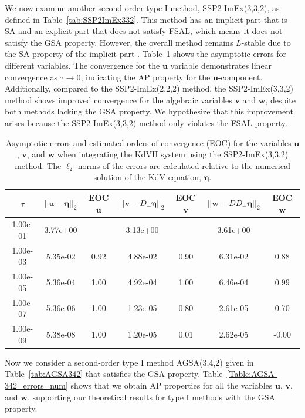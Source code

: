 \documentclass{article}
\newcommand{\ukdv}{\eta}
\begin{document}
We now examine another second-order type I method, SSP2-ImEx(3,3,2), as defined in Table~\ref{tab:SSP2ImEx332}.
This method has an implicit part that is SA and an explicit part that does not satisfy FSAL, which means
it does not satisfy the GSA property. However, the overall method remains $L$-stable due to the SA property of the
implicit part \cite{boscarino2024asymptotic}. Table~\ref{Table:SSP2-332_errors_num} shows the asymptotic
errors for different variables. The convergence for the $\pmb{u}$ variable demonstrates linear convergence
as $\tau \to 0$, indicating the AP property for the $\pmb{u}$-component. Additionally, compared to the
SSP2-ImEx(2,2,2) method, the SSP2-ImEx(3,3,2) method shows improved convergence for the
algebraic variables $\pmb{v}$ and $\pmb{w}$, despite both methods lacking the GSA property. We hypothesize that this improvement arises
because the SSP2-ImEx(3,3,2) method only violates the FSAL property.

\begin{table}[htbp]
    \centering
    \caption{Asymptotic errors and estimated orders of convergence (EOC) for the variables $\pmb{u}$, $\pmb{v}$, and $\pmb{w}$ when integrating
    the KdVH system using the SSP2-ImEx(3,3,2) method. The $\ell_2$ norms of the errors are calculated relative to
    the numerical solution of the KdV equation, $\pmb{\ukdv}$.}
    \label{Table:SSP2-332_errors_num}
    \begin{tabular}{ccccccc}
      \hline
      \hline
      \multicolumn{1}{c}{$\tau$} &
      \multicolumn{1}{c}{$||\pmb{u}-\pmb{\ukdv}||_2$} &
      \multicolumn{1}{c}{EOC $\pmb{u}$} &
      \multicolumn{1}{c}{$||\pmb{v}-D_- \pmb{\ukdv}||_2$} &
      \multicolumn{1}{c}{EOC $\pmb{v}$} &
      \multicolumn{1}{c}{$||\pmb{w}-D D_- \pmb{\ukdv}||_2$} &
      \multicolumn{1}{c}{EOC $\pmb{w}$} \\\hline
      1.00e-01 & 3.77e+00 &  & 3.13e+00 &  & 3.61e+00 &  \\
      1.00e-03 & 5.35e-02 & 0.92 & 4.88e-02 & 0.90 & 6.31e-02 & 0.88 \\
      1.00e-05 & 5.36e-04 & 1.00 & 4.92e-04 & 1.00 & 6.46e-04 & 0.99 \\
      1.00e-07 & 5.36e-06 & 1.00 & 1.23e-05 & 0.80 & 2.61e-05 & 0.70 \\
      1.00e-09 & 5.38e-08 & 1.00 & 1.20e-05 & 0.01 & 2.62e-05 & -0.00 \\
    \end{tabular}
\end{table}

Now we consider a second-order type I method AGSA(3,4,2) given in Table~\ref{tab:AGSA342}
that satisfies the GSA property. Table~\ref{Table:AGSA-342_errors_num} shows that we obtain AP
properties for all the variables $\pmb{u}$, $\pmb{v}$, and $\pmb{w}$, supporting our theoretical results for
type I methods with the GSA property.
\end{document}
